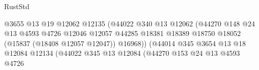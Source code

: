 \begin{lexlean}{RustStd}
\begin{coremodule}
                                                      @3655
                                                      @13
                                                      @19
                                                      @12062
                                                      @12135
                                                      (@44022
                                                        @340
                                                        @13
                                                        @12062
                                                        (@44270
                                                          @148
                                                          @24
                                                          @13
                                                          @4593
                                                          @4726
                                                          @12046
                                                          @12057
                                                          @44285
                                                          @18381
                                                          @18389
                                                          @18750
                                                          @18052
                                                          (@15837 (@18408 @12057 @12047))
                                                          @16968))
                                                      (@44014
                                                        @345
                                                        @3654
                                                        @13
                                                        @18
                                                        @12084
                                                        @12134
                                                        (@44022
                                                          @345
                                                          @13
                                                          @12084
                                                          (@44270
                                                            @153
                                                            @24
                                                            @13
                                                            @4593
                                                            @4726

\end{coremodule}
\end{lexlean}
